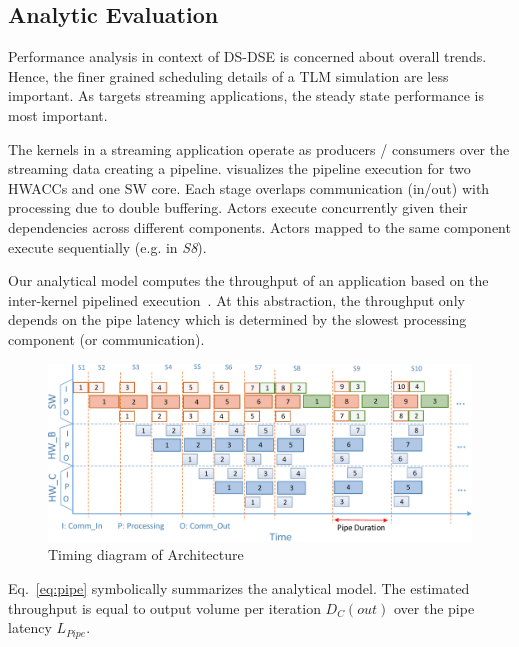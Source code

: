\subsection{Analytic Evaluation}
\label{sec:Ana}

Performance analysis in context of DS-DSE is concerned about overall trends. Hence, the finer grained scheduling details of a TLM simulation are less important. As \ga targets streaming applications, the steady state performance is most important. 

The kernels in a streaming application operate as producers / consumers over the streaming data creating a pipeline.  visualizes the pipeline execution for two HWACCs and one SW core. Each stage overlaps communication (in/out) with processing due to double buffering. Actors execute concurrently given their dependencies across different components. Actors mapped to the same component execute sequentially (e.g. in \emph{S8}).

Our analytical model computes the throughput of an application based on the inter-kernel pipelined execution~\cite{Teimouri_DAC_2015}.
At this abstraction, the throughput only depends on the pipe latency which is determined by the slowest processing component (or communication).

\begin{figure}[h]
	\centering
	\includegraphics[width=\linewidth]{fig/pPipe.pdf}
	\caption{Timing diagram of Architecture}
	\label{fig:Pipe}
	
\end{figure}


Eq.~\eqref{eq:pipe} symbolically summarizes the analytical model. The estimated throughput is equal to output volume per iteration $D_{C}(out)$ over the pipe latency $L_{Pipe}$. 

